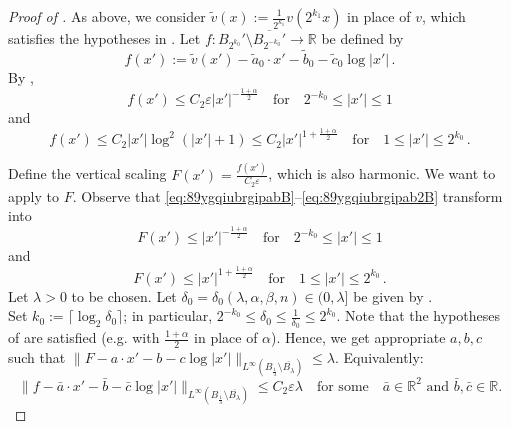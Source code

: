 \documentclass[10pt,a4paper]{amsart}
\newcommand{\R}{\mathbb{R}}
\newcommand{\ep}{\varepsilon}
\begin{document}
\begin{proof}[Proof of ]
As above, we consider $\widetilde v(x):=\frac{1}{2^{k_1}}v(2^{k_1} x)$ in place of $v$, which satisfies the hypotheses in . Let $f:B_{2^{k_0}}'\setminus \overline{B_{2^{-k_0}}'}\to\R$ be defined by
$$f(x'):=\widetilde v (x')-\widetilde a_0\cdot x'-\widetilde b_0-\widetilde c_0\log|x'|\,.$$
By ,
\begin{equation}\label{eq:89ygqiubrgipabB}
    f(x')\leq C_2\ep|x'|^{-\frac{1+\alpha}{2}}\quad\mbox{for}\quad 2^{-k_0}\leq|x'|\leq 1
\end{equation}
and
\begin{equation}\label{eq:89ygqiubrgipab2B}
    f(x')\leq C_2|x'|\log^2(|x'|+1)\leq C_2|x'|^{1+\frac{1+\alpha}{2}}\quad\mbox{for}\quad 1\leq|x'|\leq 2^{k_0}\,.
\end{equation}

Define the vertical scaling $F(x')=\frac{f(x')}{C_2\ep}$, which is also harmonic.
We want to apply  to $F$. Observe that \eqref{eq:89ygqiubrgipabB}--\eqref{eq:89ygqiubrgipab2B} transform into
\begin{equation*}
    F(x')\leq |x'|^{-\frac{1+\alpha}{2}}\quad\mbox{for}\quad 2^{-k_0}\leq|x'|\leq 1
\end{equation*}
and
\begin{equation*}
    F(x')\leq |x'|^{1+\frac{1+\alpha}{2}}\quad\mbox{for}\quad 1\leq|x'|\leq 2^{k_0}\,.
\end{equation*}
Let $\lambda>0$ to be chosen. Let $\delta_0=\delta_0(\lambda,\alpha,\beta,n)\in(0,\lambda]$ be given by .\\

Set $k_0:=\lceil\log_2 \delta_0\rceil$; in particular, $2^{-k_0}\leq \delta_0\leq \frac{1}{\delta_0}\leq 2^{k_0}$.
Note that the hypotheses of  are satisfied (e.g. with $\frac{1+\alpha}{2}$ in place of $\alpha$). Hence, we get appropriate $a,b,c$ such that $\|F-a\cdot x'-b-c\log|x'|\|_{L^\infty(B_{\frac{1}{\lambda}}\setminus \overline{B_{\lambda}})
}\leq \lambda$. Equivalently:
\begin{equation*}
    \|f-\bar a\cdot x'-\bar b -\bar c\log|x'|\|_{L^\infty(B_{\frac{1}{\lambda}}\setminus \overline{B_{\lambda}})
}\leq C_2\ep\lambda\quad\mbox{for some}\quad \bar a\in\R^{2}\mbox{ and }\bar b,\bar c\in\R.
\end{equation*}




\end{proof}
\end{document}
